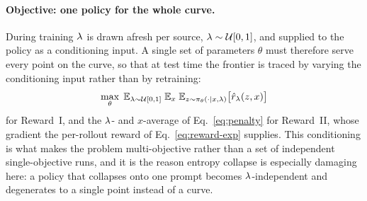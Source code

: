 \paragraph{Objective: one policy for the whole curve.}
During training $\lambda$ is drawn afresh per source, $\lambda \sim \mathcal{U}[0,1]$,
and supplied to the policy as a conditioning input. A single set of parameters
$\theta$ must therefore serve every point on the curve, so that at test time the
frontier is traced by varying the conditioning input rather than by retraining:
\begin{equation}
  \max_{\theta}\;
  \mathbb{E}_{\lambda \sim \mathcal{U}[0,1]}\;
  \mathbb{E}_{x}\;
  \mathbb{E}_{z \sim \pi_\theta(\cdot \mid x, \lambda)}\bigl[\hat r_{\lambda}(z,x)\bigr]
  \label{eq:objective}
\end{equation}
for Reward~I, and the $\lambda$- and $x$-average of Eq.~\eqref{eq:penalty} for
Reward~II, whose gradient the per-rollout reward of Eq.~\eqref{eq:reward-exp}
supplies. This conditioning is what makes the problem
multi-objective rather than a set of independent single-objective runs, and it
is the reason entropy collapse is especially damaging here: a policy that
collapses onto one prompt becomes $\lambda$-independent and degenerates to a single
point instead of a curve.
